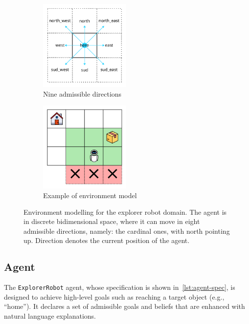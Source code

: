 \documentclass[12pt,a4paper,openright,twoside]{book}
\begin{document}
\begin{figure}
    \centering
    \begin{subfigure}[c]{0.48\linewidth}
        \centering
        \includegraphics[height=4.5cm]{figures/directions.pdf}
        \caption{Nine admissible directions}
        \label{fig:directions}
    \end{subfigure}
    \hfill
    \begin{subfigure}[c]{0.48\linewidth}
        \centering
        \includegraphics[height=4.5cm]{figures/world.pdf}
        \caption{Example of environment model}
        \label{fig:model}
    \end{subfigure}
    \caption{
        Environment modelling for the explorer robot domain.
        The agent is in discrete bidimensional space, where it can move in eight admissible directions, namely: the cardinal ones, with north pointing up.
        Direction  denotes the current position of the agent.
    }
    \label{fig:environment-model}
\end{figure}

\subsection{Agent}\label{sec:explorer-agent}

The \texttt{ExplorerRobot} agent, whose specification is shown in~\cref{lst:agent-spec}, is designed to achieve high-level goals such as reaching a target object (e.g., “home”). It declares a set of admissible goals and beliefs that are enhanced with natural language explanations.
\end{document}
